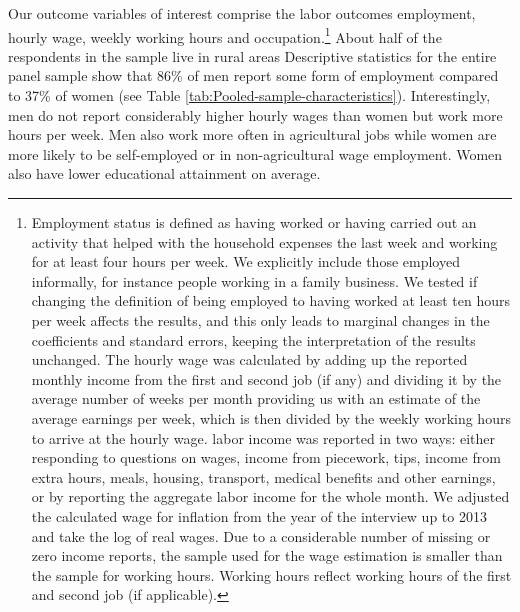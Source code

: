 \documentclass[12pt,english]{article}
\begin{document}
Our outcome variables of interest comprise the labor outcomes employment, hourly wage, weekly working hours and occupation.\footnote{Employment status is defined as having worked or having carried out an activity that helped with the household expenses the last week and working for at least four hours per week. We explicitly include those employed informally, for instance people working in a family business. We tested if changing the definition of being employed to having worked at least ten hours per week affects the results, and this only leads to marginal changes in the coefficients and standard errors, keeping the interpretation of the results unchanged. The hourly wage was calculated by adding up the reported monthly income from the first and second job (if any) and dividing it by the average number of weeks per month providing us with an estimate of the average earnings per week, which is then divided by the weekly working hours to arrive at the hourly wage.  labor income was reported in two ways: either responding to questions on wages, income from piecework, tips, income from extra hours, meals, housing, transport, medical benefits and other earnings, or by reporting the aggregate labor income for the whole month. We adjusted the calculated wage for inflation from the year of the interview up to 2013 and take the log of real wages.  Due to a considerable number of missing or zero income reports, the sample used for the wage estimation is smaller than the sample for working hours. Working hours reflect working hours of the first and second job (if applicable).}  About half of the respondents in the sample live in rural areas   Descriptive statistics for the entire panel sample show that 86\% of men report some form of employment compared to 37\% of women (see Table \ref{tab:Pooled-sample-characteristics}). Interestingly, men do not report considerably higher hourly wages than women but work more hours per week. Men also work more often in agricultural jobs while women are more likely to be self-employed or in non-agricultural wage employment. Women also have lower educational attainment on average.
 
\end{document}
